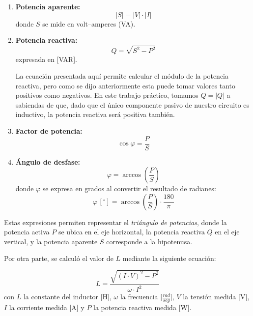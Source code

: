 \documentclass{article}
\begin{document}
            \begin{enumerate}
                \item \textbf{Potencia aparente:}
                \[
                    |S| = |V| \cdot |I|
                \]
                donde $S$ se mide en volt–amperes (VA).

                \item \textbf{Potencia reactiva:}
                \[
                    Q = \sqrt{S^{2} - P^{2}}
                \]
                expresada en [VAR]. \par
                
                   La ecuación presentada aquí permite calcular el módulo de la potencia reactiva, pero como se dijo
                anteriormente esta puede tomar valores tanto positivos como negativos. En este trabajo práctico, 
                tomamos $Q=|Q|$ a sabiendas de que, dado que el único componente pasivo de nuestro circuito es inductivo, 
                la potencia reactiva será positiva también.

                \item \textbf{Factor de potencia:}
                \[
                    \cos \varphi = \frac{P}{S}
                \]

                \item \textbf{Ángulo de desfase:}
                \[
                    \varphi = \arccos\left( \frac{P}{S} \right)
                \]
                donde $\varphi$ se expresa en grados al convertir el resultado de 
                radianes:
                \[
                    \varphi \,[^\circ] = \arccos\left( \frac{P}{S} \right) \cdot 
                    \frac{180}{\pi}
                \]
            \end{enumerate}

                    Estas expresiones permiten representar el \textit{triángulo de potencias}, 
                    donde la potencia activa $P$ se ubica en el eje horizontal, la potencia 
                    reactiva $Q$ en el eje vertical, y la potencia aparente $S$ corresponde a 
                    la hipotenusa.\par

                Por otra parte, se calculó el valor de $L$ mediante la siguiente ecuación:

                \begin{equation*}
                    L = \frac{\sqrt{(I \cdot V)^2- P^2}}{\omega \cdot I^2} 
                \end{equation*}
                con $L$ la constante del inductor [H], $\omega$ la frecuencia [$\frac{rad}{seg}$], $V$ la tensión medida [V], $I$ la corriente medida [A] y $P$ la potencia reactiva medida [W]. \par
                
\end{document}
